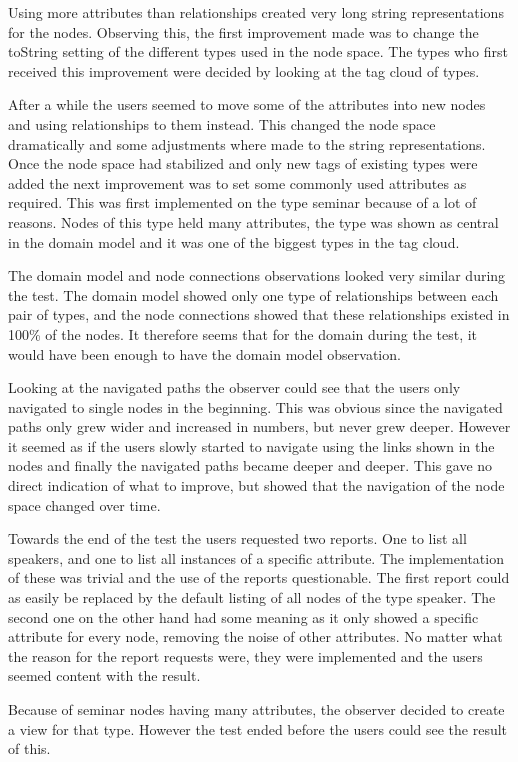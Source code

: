 \documentclass[a4paper]{report}
\begin{document}
Using more attributes than relationships created very long string representations for the nodes. Observing this, the first improvement made was to change the toString setting of the different types used in the node space. The types who first received this improvement were decided by looking at the tag cloud of types.

After a while the users seemed to move some of the attributes into new nodes and using relationships to them instead. This changed the node space dramatically and some adjustments where made to the string representations. Once the node space had stabilized and only new tags of existing types were added the next improvement was to set some commonly used attributes as required. This was first implemented on the type seminar because of a lot of reasons. Nodes of this type held many attributes, the type was shown as central in the domain model and it was one of the biggest types in the tag cloud.

The domain model and node connections observations looked very similar during the test. The domain model showed only one type of relationships between each pair of types, and the node connections showed that these relationships existed in 100\% of the nodes. It therefore seems that for the domain during the test, it would have been enough to have the domain model observation.

Looking at the navigated paths the observer could see that the users only navigated to single nodes in the beginning. This was obvious since the navigated paths only grew wider and increased in numbers, but never grew deeper. However it seemed as if the users slowly started to navigate using the links shown in the nodes and finally the navigated paths became deeper and deeper. This gave no direct indication of what to improve, but showed that the navigation of the node space changed over time.

Towards the end of the test the users requested two reports. One to list all speakers, and one to list all instances of a specific attribute. The implementation of these was trivial and the use of the reports questionable. The first report could as easily be replaced by the default listing of all nodes of the type speaker. The second one on the other hand had some meaning as it only showed a specific attribute for every node, removing the noise of other attributes. No matter what the reason for the report requests were, they were implemented and the users seemed content with the result.

Because of seminar nodes having many attributes, the observer decided to create a view for that type. However the test ended before the users could see the result of this.
\end{document}
